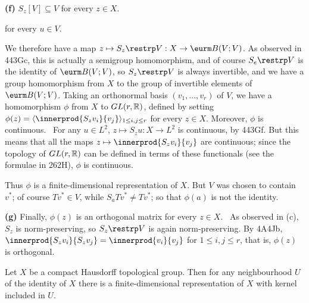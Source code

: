 {\medskip

{\bf (f)} $S_z[V]\subseteq V$ for every $z\in X$.   \Prf\


\noindent for every $u\in V$.\ \Qed

We therefore have a map $z\mapsto S_z\restrp V:X\to\eurm B(V;V)$.
As observed in 443Gc, this is actually a semigroup
homomorphism, and of course $S_e\restrp V$ is the identity of
$\eurm B(V;V)$, so $S_z\restrp V$ is always invertible, and we have a
group homomorphism from $X$ to the group of invertible elements of
$\eurm B(V;V)$.   Taking an orthonormal basis $(v_1,\ldots,v_r)$ of $V$,
we have a homomorphism $\phi$ from $X$ to $GL(r,\Bbb R)$, defined by
setting $\phi(z)=\langle\innerprod{S_zv_i}{v_j}\rangle_{1\le i,j\le r}$ for
every $z\in X$.   Moreover, $\phi$ is continuous.   \Prf\ For any
$u\in L^2$,
$z\mapsto S_zu:X\to L^2$ is continuous, by 443Gf.   But this means that
all the maps $z\mapsto\innerprod{S_zv_i}{v_j}$ are continuous;
since the topology
of $GL(r,\Bbb R)$ can be defined in terms of these functionals (see the
formulae in 262H), $\phi$ is continuous.\ \Qed

Thus $\phi$ is a finite-dimensional representation of $X$.   But $V$ was
chosen to contain $v^*$;  of course $Tv^*\in V$, while
$S_aTv^*\ne Tv^*$;  so that $\phi(a)$ is not the identity.

\medskip

{\bf (g)} Finally, $\phi(z)$ is an orthogonal matrix for every $z\in X$.
\Prf\ As observed in (c), $S_z$ is norm-preserving, so $S_z\restrp V$ is
again norm-preserving.   By 4A4Jb,
$\innerprod{S_zv_i}{S_zv_j}=\innerprod{v_i}{v_j}$ for $1\le i,j\le r$, that
is, $\phi(z)$ is orthogonal.\ \Qed
}%

 Let $X$ be a compact Hausdorff topological
group.   Then for any neighbourhood $U$ of the identity of $X$ there is
a finite-dimensional representation of $X$ with kernel included in $U$.



